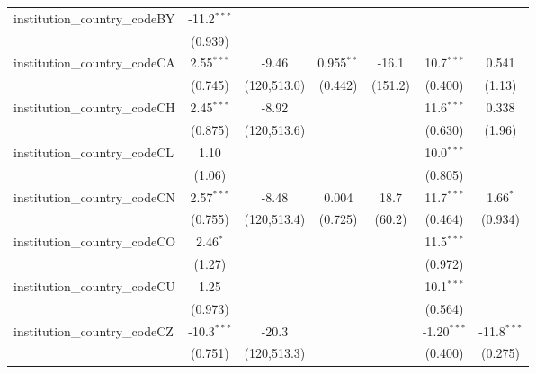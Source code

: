 \begin{tabular}{lcccccc}
   institution\_country\_codeBY          & -11.2$^{***}$  &               &               &            &               &   \\   
                                         & (0.939)        &               &               &            &               &   \\   
   institution\_country\_codeCA          & 2.55$^{***}$   & -9.46         & 0.955$^{**}$  & -16.1      & 10.7$^{***}$  & 0.541\\   
                                         & (0.745)        & (120,513.0)   & (0.442)       & (151.2)    & (0.400)       & (1.13)\\   
   institution\_country\_codeCH          & 2.45$^{***}$   & -8.92         &               &            & 11.6$^{***}$  & 0.338\\   
                                         & (0.875)        & (120,513.6)   &               &            & (0.630)       & (1.96)\\   
   institution\_country\_codeCL          & 1.10           &               &               &            & 10.0$^{***}$  &   \\   
                                         & (1.06)         &               &               &            & (0.805)       &   \\   
   institution\_country\_codeCN          & 2.57$^{***}$   & -8.48         & 0.004         & 18.7       & 11.7$^{***}$  & 1.66$^{*}$\\   
                                         & (0.755)        & (120,513.4)   & (0.725)       & (60.2)     & (0.464)       & (0.934)\\   
   institution\_country\_codeCO          & 2.46$^{*}$     &               &               &            & 11.5$^{***}$  &   \\   
                                         & (1.27)         &               &               &            & (0.972)       &   \\   
   institution\_country\_codeCU          & 1.25           &               &               &            & 10.1$^{***}$  &   \\   
                                         & (0.973)        &               &               &            & (0.564)       &   \\   
   institution\_country\_codeCZ          & -10.3$^{***}$  & -20.3         &               &            & -1.20$^{***}$ & -11.8$^{***}$\\   
                                         & (0.751)        & (120,513.3)   &               &            & (0.400)       & (0.275)\\   

\end{tabular}
